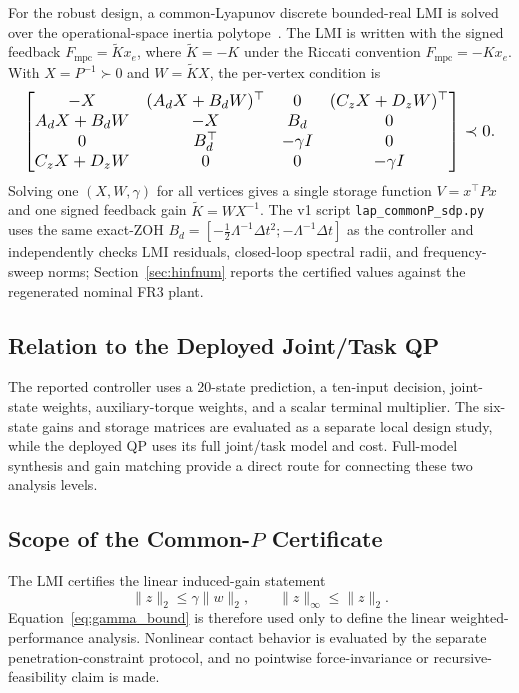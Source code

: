 For the robust design, a common-Lyapunov discrete bounded-real LMI is solved over the operational-space inertia polytope~\cite{boyd1994}. The LMI is written with the signed feedback $F_{\mathrm{mpc}}=\tilde Kx_e$, where $\tilde K=-K$ under the Riccati convention $F_{\mathrm{mpc}}=-Kx_e$. With $X=P^{-1}\succ0$ and $W=\tilde KX$, the per-vertex condition is
\begin{equation}
\resizebox{0.98\columnwidth}{!}{$
\begin{bmatrix}
-X & (A_dX+B_dW)^\top & 0 & (C_zX+D_zW)^\top\\
A_dX+B_dW & -X & B_d & 0\\
0 & B_d^\top & -\gamma I & 0\\
C_zX+D_zW & 0 & 0 & -\gamma I
\end{bmatrix}\prec0 .
$}
\label{eq:lmi}
\end{equation}
Solving one $(X,W,\gamma)$ for all vertices gives a single storage function $V=x^\top Px$ and one signed feedback gain $\tilde K=WX^{-1}$. The v1 script \texttt{lap\_commonP\_sdp.py} uses the same exact-ZOH $B_d=[-\frac12\Lambda^{-1}\Delta t^2;-\Lambda^{-1}\Delta t]$ as the controller and independently checks LMI residuals, closed-loop spectral radii, and frequency-sweep norms; Section~\ref{sec:hinfnum} reports the certified values against the regenerated nominal FR3 plant.

\subsection{Relation to the Deployed Joint/Task QP}

The reported controller uses a 20-state prediction, a ten-input decision, joint-state weights, auxiliary-torque weights, and a scalar terminal multiplier. The six-state gains and storage matrices are evaluated as a separate local design study, while the deployed QP uses its full joint/task model and cost. Full-model synthesis and gain matching provide a direct route for connecting these two analysis levels.

\subsection{Scope of the Common-$P$ Certificate}

The LMI certifies the linear induced-gain statement
\begin{equation}
\|z\|_2\le\gamma\|w\|_2,\qquad
\|z\|_\infty\le\|z\|_2.
\label{eq:gamma_bound}
\end{equation}
Equation~\eqref{eq:gamma_bound} is therefore used only to define the linear
weighted-performance analysis. Nonlinear contact behavior is evaluated by the
separate penetration-constraint protocol, and no pointwise force-invariance or
recursive-feasibility claim is made.

